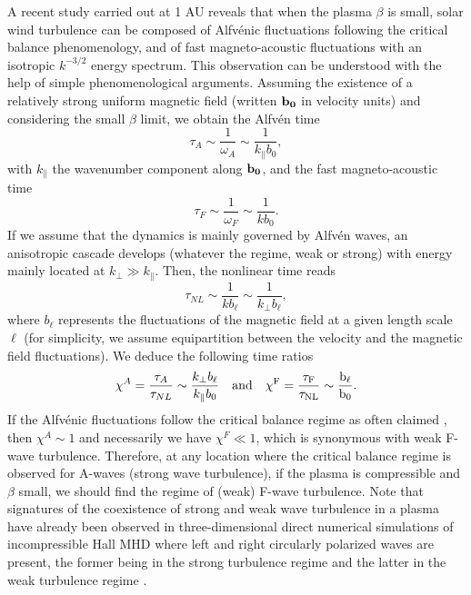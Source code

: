 \documentclass{jpp}
\def\be{\begin{equation}}
\def\ee{\end{equation}}
\begin{document}
A recent study carried out at 1 AU \citep{Zhao2022b} reveals that when the plasma $\beta$ is small, solar wind turbulence can be composed of Alfv\'enic fluctuations following the critical balance phenomenology, and of fast magneto-acoustic fluctuations with an isotropic $k^{-3/2}$ energy spectrum. This observation can be understood with the help of simple phenomenological arguments. 
Assuming the existence of a relatively strong uniform magnetic field (written ${\bf b_0}$ in velocity units) and considering the small $\beta$ limit, we obtain the Alfv\'en time 
\be
\tau_A \sim \frac{1}{\omega_A} \sim \frac{1}{k_\parallel b_0} ,
\ee
with $k_\parallel$ the wavenumber component along ${\bf b_0}$, and the fast magneto-acoustic time 
\be
\tau_F \sim \frac{1}{\omega_F} \sim \frac{1}{k b_0} .
\ee
If we assume that the dynamics is mainly governed by Alfvén waves, an anisotropic cascade develops (whatever the regime, weak or strong) with energy mainly located at $k_\perp \gg k_\parallel$. Then, the nonlinear time reads
\be
\tau_{NL} \sim \frac{1}{k b_\ell}  \sim \frac{1}{k_\perp b_\ell} ,
\ee
where $b_\ell$ represents the fluctuations of the magnetic field at a given length scale $\ell$ (for simplicity, we assume equipartition between the velocity and the magnetic field fluctuations). We deduce the following time ratios 
\be
\chi^A = \frac{\tau_A}{\tau_{NL}} \sim \frac{k_\perp b_\ell}{k_\parallel b_0} \quad \rm{and} \quad 
\chi^F =  \frac{\tau_F}{\tau_{NL}} \sim \frac{b_\ell}{b_0}  . 
\ee
If the Alfv\'enic fluctuations follow the critical balance regime as often claimed \citep{Horbury2008}, then $\chi^A \sim 1$ and necessarily we have $\chi^F \ll 1$, which is synonymous with weak F-wave turbulence. Therefore, at any location where the critical balance regime is observed for A-waves (strong wave turbulence), if the plasma is compressible and $\beta$ small, we should find the regime of (weak) F-wave turbulence. Note that signatures of the coexistence of strong and weak wave turbulence in a plasma have already been observed in three-dimensional direct numerical simulations of incompressible Hall MHD where left and right circularly polarized waves are present, the former being in the strong turbulence regime and the latter in the weak turbulence regime \citep{Meyrand2018}. 
\end{document}

